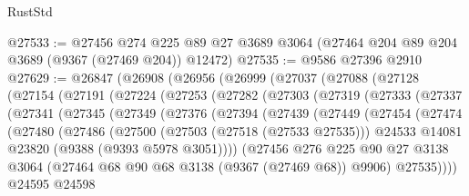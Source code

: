 \begin{lexlean}{RustStd}
\begin{coremodule}
@27533 := @27456
    @274
    @225
    @89
    @27
    @3689
    @3064
    (@27464 @204 @89 @204 @3689 (@9367 (@27469 @204)) @12472)
@27535 := @9586 @27396 @2910
@27629 := @26847
    (@26908
      (@26956
        (@26999
          (@27037
            (@27088
              (@27128
                (@27154
                  (@27191
                    (@27224
                      (@27253
                        (@27282
                          (@27303
                            (@27319
                              (@27333
                                (@27337
                                  (@27341
                                    (@27345
                                      (@27349
                                        (@27376
                                          (@27394
                                            (@27439
                                              (@27449
                                                (@27454
                                                  (@27474
                                                    (@27480
                                                      (@27486
                                                        (@27500
                                                          (@27503 (@27518 (@27533 @27535)))
                                                          @24533
                                                          @14081
                                                          @23820
                                                          (@9388 (@9393 @5978 @3051))))
                                                      (@27456
                                                        @276
                                                        @225
                                                        @90
                                                        @27
                                                        @3138
                                                        @3064
                                                        (@27464
                                                          @68
                                                          @90
                                                          @68
                                                          @3138
                                                          (@9367 (@27469 @68))
                                                          @9906)
                                                        @27535))))
                                                @24595
                                                @24598

\end{coremodule}
\end{lexlean}
